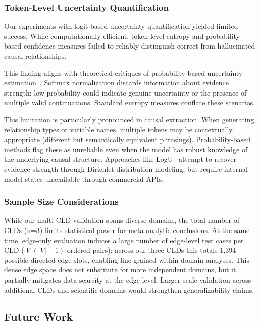 \subsubsection{Token-Level Uncertainty Quantification}

Our experiments with logit-based uncertainty quantification yielded limited success. While computationally efficient, token-level entropy and probability-based confidence measures failed to reliably distinguish correct from hallucinated causal relationships.

This finding aligns with theoretical critiques of probability-based uncertainty estimation~\citep{ma2025estimatingllmuncertainty}. Softmax normalization discards information about evidence strength: low probability could indicate genuine uncertainty or the presence of multiple valid continuations. Standard entropy measures conflate these scenarios.

This limitation is particularly pronounced in causal extraction. When generating relationship types or variable names, multiple tokens may be contextually appropriate (different but semantically equivalent phrasings). Probability-based methods flag these as unreliable even when the model has robust knowledge of the underlying causal structure. Approaches like LogU~\citep{ma2025estimatingllmuncertainty} attempt to recover evidence strength through Dirichlet distribution modeling, but require internal model states unavailable through commercial APIs.

\subsubsection{Sample Size Considerations}

While our multi-CLD validation spans diverse domains, the total number of CLDs (n=3) limits statistical power for meta-analytic conclusions. At the same time, edge-only evaluation induces a large number of edge-level test cases per CLD ($|V|(|V|-1)$ ordered pairs): across our three CLDs this totals 1,394 possible directed edge slots, enabling fine-grained within-domain analyses. This dense edge space does not substitute for more independent domains, but it partially mitigates data scarcity at the edge level. Larger-scale validation across additional CLDs and scientific domains would strengthen generalizability claims.

\subsection{Future Work}
\label{sec:discussion_future}

